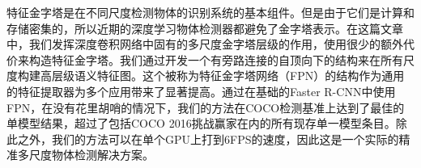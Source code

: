 \documentclass[../main.tex]{subfile}
\begin{document}
特征金字塔是在不同尺度检测物体的识别系统的基本组件。但是由于它们是计算和存储密集的，所以近期的深度学习物体检测器都避免了金字塔表示。在这篇文章中，我们发挥深度卷积网络中固有的多尺度金字塔层级的作用，使用很少的额外代价来构造特征金字塔。我们通过开发一个有旁路连接的自顶向下的结构来在所有尺度构建高层级语义特征图。这个被称为特征金字塔网络（FPN）的结构作为通用的特征提取器为多个应用带来了显著提高。通过在基础的Faster R-CNN中使用FPN，在没有花里胡哨的情况下，我们的方法在COCO检测基准上达到了最佳的单模型结果，超过了包括COCO 2016挑战赢家在内的所有现存单一模型条目。除此之外，我们的方法可以在单个GPU上打到6FPS的速度，因此这是一个实际的精准多尺度物体检测解决方案。
\end{document}
